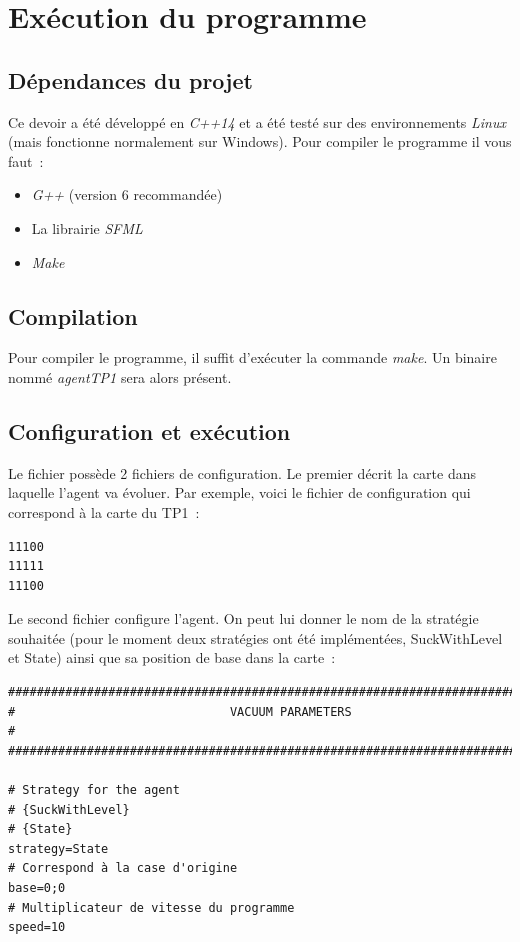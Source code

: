 \documentclass{article}
\begin{document}
\section{Exécution du programme}
\subsection{Dépendances du projet}
Ce devoir a été développé en \emph{C++14} et a été testé sur des environnements \emph{Linux} (mais fonctionne normalement sur Windows). Pour compiler le programme il vous faut~:
\begin{itemize}
    \item \emph{G++} (version 6 recommandée)
    \item La librairie \emph{SFML}
    \item \emph{Make}
\end{itemize}
\subsection{Compilation}
Pour compiler le programme, il suffit d'exécuter la commande \emph{make}. Un binaire nommé \emph{agentTP1} sera alors présent.
\subsection{Configuration et exécution}
Le fichier possède 2 fichiers de configuration. Le premier décrit la carte dans laquelle l'agent va évoluer. Par exemple, voici le fichier de configuration qui correspond à la carte du TP1~:
\begin{verbatim}
11100
11111
11100
\end{verbatim}

Le second fichier configure l'agent. On peut lui donner le nom de la stratégie souhaitée (pour le moment deux stratégies ont été implémentées, SuckWithLevel et State) ainsi que sa position de base dans la carte~:

\begin{verbatim}
###############################################################################
#                              VACUUM PARAMETERS                              #
###############################################################################

# Strategy for the agent
# {SuckWithLevel}
# {State}
strategy=State
# Correspond à la case d'origine
base=0;0
# Multiplicateur de vitesse du programme
speed=10
\end{verbatim}
\end{document}
